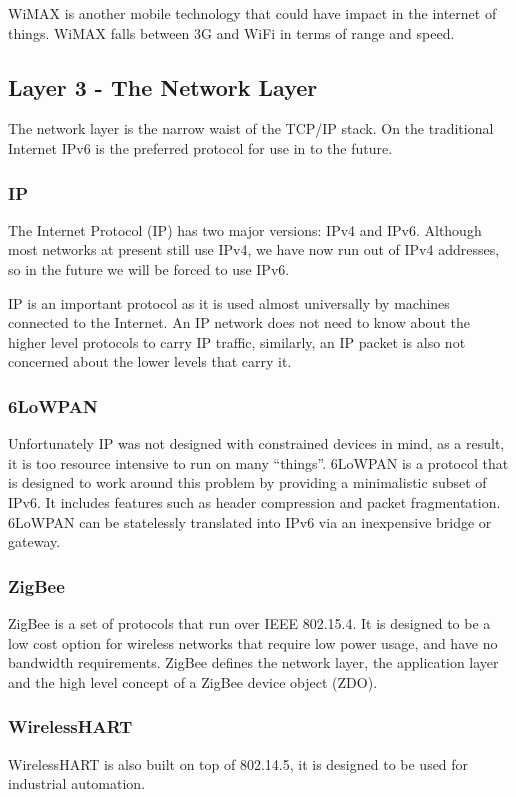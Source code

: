\documentclass[10pt,journal,compsoc]{IEEEtran}
\begin{document}
WiMAX is another mobile technology that could have impact in the internet of
things. WiMAX falls between 3G and WiFi in terms of range and speed.  

\subsection{Layer 3 - The Network Layer}
The network layer is the narrow waist of the TCP/IP stack. On the traditional
Internet IPv6 is the preferred protocol for use in to the future.

\subsubsection{IP}
The Internet Protocol (IP) has two major versions: IPv4 and IPv6. Although most
networks at present still use IPv4, we have now run out of IPv4 addresses, so
in the future we will be forced to use IPv6.

IP is an important protocol as it is used almost universally by machines
connected to the Internet. An IP network does not need to know about the higher
level protocols to carry IP traffic, similarly, an IP packet is also not
concerned about the lower levels that carry it. 

\subsubsection{6LoWPAN}
Unfortunately IP was not designed with constrained devices in mind, as a
result, it is too resource intensive to run on many ``things''. 6LoWPAN is a
protocol that is designed to work around this problem by providing a
minimalistic subset of IPv6. It includes features such as header compression
and packet fragmentation. 6LoWPAN can be statelessly translated into IPv6 via
an inexpensive bridge or gateway. 

\subsubsection{ZigBee}
ZigBee is a set of protocols that run over IEEE 802.15.4. It is designed to be a
low cost option for wireless networks that require low power usage, and have no
bandwidth requirements. ZigBee defines the network layer, the application layer
and the high level concept of a ZigBee device object (ZDO). 

\subsubsection{WirelessHART}
WirelessHART is also built on top of 802.14.5, it is designed to be used for
industrial automation. 
\end{document}
